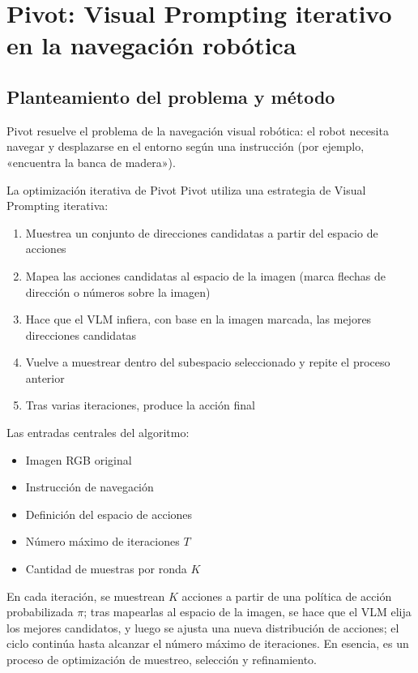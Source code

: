\documentclass[a4paper]{article}
\begin{document}
\section{Pivot: Visual Prompting iterativo en la navegación robótica}

\subsection{Planteamiento del problema y método}

Pivot resuelve el problema de la navegación visual robótica: el robot necesita navegar y desplazarse en el entorno según una instrucción (por ejemplo, «encuentra la banca de madera»).

\begin{importantbox}{La optimización iterativa de Pivot}
Pivot utiliza una estrategia de Visual Prompting iterativa:
\begin{enumerate}
    \item Muestrea un conjunto de direcciones candidatas a partir del espacio de acciones
    \item Mapea las acciones candidatas al espacio de la imagen (marca flechas de dirección o números sobre la imagen)
    \item Hace que el VLM infiera, con base en la imagen marcada, las mejores direcciones candidatas
    \item Vuelve a muestrear dentro del subespacio seleccionado y repite el proceso anterior
    \item Tras varias iteraciones, produce la acción final
\end{enumerate}
\end{importantbox}

Las entradas centrales del algoritmo:
\begin{itemize}
    \item Imagen RGB original
    \item Instrucción de navegación
    \item Definición del espacio de acciones
    \item Número máximo de iteraciones $T$
    \item Cantidad de muestras por ronda $K$
\end{itemize}

En cada iteración, se muestrean $K$ acciones a partir de una política de acción probabilizada $\pi$; tras mapearlas al espacio de la imagen, se hace que el VLM elija los mejores candidatos, y luego se ajusta una nueva distribución de acciones; el ciclo continúa hasta alcanzar el número máximo de iteraciones. En esencia, es un proceso de optimización de muestreo, selección y refinamiento.
\end{document}
